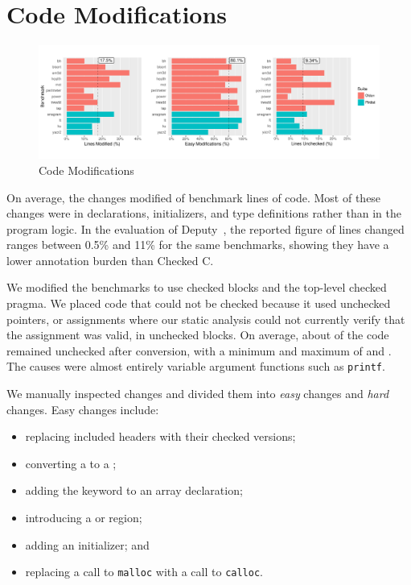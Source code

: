 \begin{table}[ht]

\end{table}

\section{Code Modifications}
\label{sec:eval-code-changes}

\begin{figure}[ht]
\centering
\includegraphics[width=\linewidth]{scripts/modifications}
\caption{Code Modifications}
\label{fig:cm-plot}
\end{figure}

On average, the changes modified \ResultLinesModifiedMean of benchmark
lines of code. Most of these changes were in declarations,
initializers, and type definitions rather than in the program logic.
In the evaluation of Deputy~\cite{Condit2007}, the reported figure of
lines changed ranges between 0.5\% and 11\% for the same benchmarks,
showing they have a lower annotation burden than Checked C.

We modified the benchmarks to use checked blocks and the top-level
checked pragma. We placed code that could not be checked because it
used unchecked pointers, or assignments where our static analysis
could not currently verify that the assignment was valid, in unchecked
blocks. On average, about \ResultLinesUncheckedMean of the code
remained unchecked after conversion, with a minimum and maximum of
\ResultLinesUncheckedMin and \ResultLinesUncheckedMax. The causes were
almost entirely variable argument functions such as
\lstinline|printf|.

We manually inspected changes and divided them into \emph{easy}
changes and \emph{hard} changes. Easy changes include:

\begin{itemize}
\item replacing included headers with their checked versions;
\item converting a \uncheckedptrT{} to a \PtrT{};
\item adding the \kwchecked{} keyword to an array declaration;
\item introducing a \kwchecked{} or \kwunchecked{} region;
\item adding an initializer; and
\item replacing a call to \lstinline|malloc| with a call to
\lstinline|calloc|.
\end{itemize}

